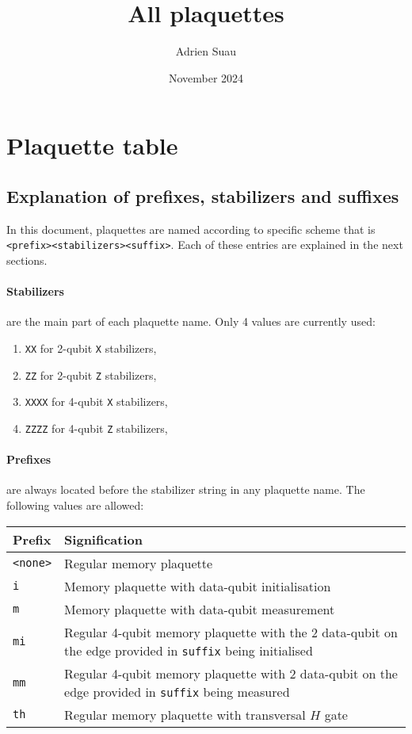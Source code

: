 \documentclass{article}
\title{All plaquettes}
\author{Adrien Suau}
\date{November 2024}
\begin{document}
\maketitle

\section{Plaquette table}

\subsection{Explanation of prefixes, stabilizers and suffixes}

In this document, plaquettes are named according to specific scheme that is 
\texttt{<prefix><stabilizers><suffix>}. Each of these entries are explained in the next
sections.

\paragraph{Stabilizers} are the main part of each plaquette name. Only 4 values are currently used:

\begin{enumerate}
\item \texttt{XX} for 2-qubit \texttt{X} stabilizers,
\item \texttt{ZZ} for 2-qubit \texttt{Z} stabilizers,
\item \texttt{XXXX} for 4-qubit \texttt{X} stabilizers,
\item \texttt{ZZZZ} for 4-qubit \texttt{Z} stabilizers,
\end{enumerate}

\paragraph{Prefixes} are always located before the stabilizer string in any plaquette name.
The following values are allowed:

\begin{center}
\begin{tabular}{|l|p{}|}
    \hline
    Prefix & Signification \\
    \hline 
    \texttt{<none>} & Regular memory plaquette \\
    \hline 
    \texttt{i} & Memory plaquette with data-qubit initialisation \\
    \hline 
    \texttt{m} & Memory plaquette with data-qubit measurement \\
    \hline 
    \texttt{mi} & Regular 4-qubit memory plaquette with the 2 data-qubit on the edge provided in \texttt{suffix} being initialised \\
    \hline 
    \texttt{mm} & Regular 4-qubit memory plaquette with 2 data-qubit on the edge provided in \texttt{suffix} being measured \\
    \hline 
    \texttt{th} & Regular memory plaquette with transversal $H$ gate \\
    \hline
\end{tabular}
\end{center}
\end{document}
